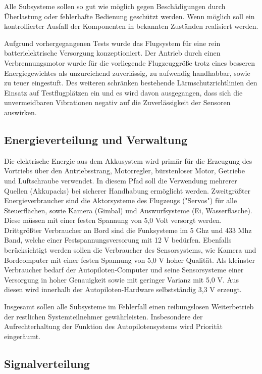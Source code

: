 Alle Subsysteme sollen so gut wie möglich gegen Beschädigungen durch Überlastung oder fehlerhafte Bedienung geschützt werden.
Wenn möglich soll ein kontrollierter Ausfall der Komponenten in bekannten Zuständen realisiert werden.

Aufgrund vorhergegangenen Tests wurde das Flugsystem für eine rein batterielektrische Versorgung konzeptioniert.
Der Antrieb durch einen Verbrennungsmotor wurde für die vorliegende Flugzeuggröße trotz eines besseren Energiegewichtes als unzureichend zuverlässig, zu aufwendig handhabbar, sowie zu teuer eingestuft.
Des weiteren schränken bestehende Lärmschutzrichtlinien den Einsatz auf Testflugplätzen ein und es wird davon ausgegangen, dass sich die unvermeidbaren Vibrationen negativ auf die Zuverlässigkeit der Sensoren auswirken.

\subsection{Energieverteilung und Verwaltung}

Die elektrische Energie aus dem Akkusystem wird primär für die Erzeugung des Vortriebs über den Antriebsstrang, Motorregler, bürstenloser Motor, Getriebe und Luftschraube verwendet.
In diesem Pfad soll die Verwendung mehrerer Quellen (Akkupacks) bei sicherer Handhabung ermöglicht werden.
Zweitgrößter Energieverbraucher sind die Aktorsysteme des Flugzeugs ("Servos") für alle Steuerflächen, sowie Kamera (Gimbal) und Auswurfsysteme (Ei, Wasserflasche). Diese müssen mit einer festen Spannung von 5,0 Volt versorgt werden.
Drittgrößter Verbraucher an Bord sind die Funksysteme im 5 Ghz und 433 Mhz Band, welche einer Festspannungsversorung mit 12 V  bedürfen.
Ebenfalls berücksichtigt werden sollen die Verbraucher des Sensorsystems, wie Kamera und Bordcomputer mit einer festen Spannung von 5,0 V hoher Qualität.
Als kleinster Verbraucher bedarf der Autopiloten-Computer und seine Sensorsysteme einer Versorgung in hoher Genauigkeit sowie mit geringer Varianz mit 5,0 V.
Aus diesen wird innerhalb der Autopiloten-Hardware selbstständig 3,3 V erzeugt.

Insgesamt sollen alle Subsysteme im Fehlerfall einen reibungslosen Weiterbetrieb der restlichen Systemteilnehmer gewährleisten. Insbesondere der Aufrechterhaltung der Funktion des Autopilotensystems wird Priorität eingeräumt.


\subsection{Signalverteilung}


